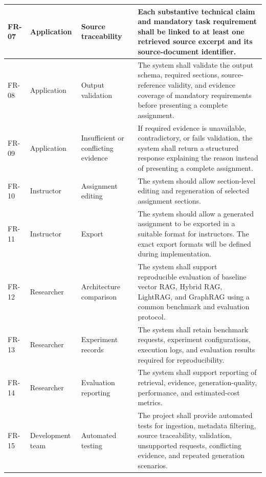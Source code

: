 \documentclass[12pt,a4paper]{article}
\begin{document}
\begin{xltabular}{\textwidth}{
    |p{12mm}|p{28mm}|p{36mm}|X|
}
FR-07 &
Application &
Source traceability &
Each substantive technical claim and mandatory task
requirement shall be linked to at least one retrieved source
excerpt and its source-document identifier. \\
\hline

FR-08 &
Application &
Output validation &
The system shall validate the output schema, required sections,
source-reference validity, and evidence coverage of mandatory
requirements before presenting a complete assignment. \\
\hline

FR-09 &
Application &
Insufficient or conflicting evidence &
If required evidence is unavailable, contradictory, or fails
validation, the system shall return a structured response
explaining the reason instead of presenting a complete
assignment. \\
\hline

FR-10 &
Instructor &
Assignment editing &
The system should allow section-level editing and regeneration
of selected assignment sections. \\
\hline

FR-11 &
Instructor &
Export &
The system should allow a generated assignment to be exported
in a suitable format for instructors. The exact export formats
will be defined during implementation. \\
\hline

FR-12 &
Researcher &
Architecture comparison &
The system shall support reproducible evaluation of baseline
vector RAG, Hybrid RAG, LightRAG, and GraphRAG using a common
benchmark and evaluation protocol. \\
\hline

FR-13 &
Researcher &
Experiment records &
The system shall retain benchmark requests, experiment
configurations, execution logs, and evaluation results
required for reproducibility. \\
\hline

FR-14 &
Researcher &
Evaluation reporting &
The system shall support reporting of retrieval, evidence,
generation-quality, performance, and estimated-cost metrics. \\
\hline

FR-15 &
Development team &
Automated testing &
The project shall provide automated tests for ingestion,
metadata filtering, source traceability, validation,
unsupported requests, conflicting evidence, and repeated
generation scenarios. \\
\hline

\end{xltabular}
\endgroup
\end{document}
